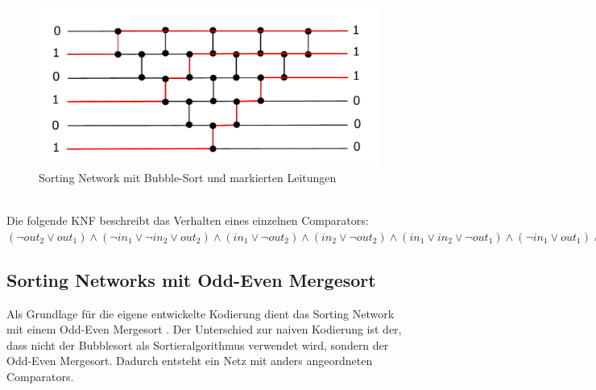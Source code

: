 \documentclass[a4,abstract=on]{scrartcl}
\begin{document}
\begin{figure}[H]
\centering
\includegraphics[width=\textwidth]{sorting_network_bubble_rot.pdf}
\caption{Sorting Network mit Bubble-Sort und markierten Leitungen}
\label{fig:sorting_network_naiv_bsp1}
\end{figure}
\ \\
Die folgende KNF beschreibt das Verhalten eines einzelnen Comparators:\\
$(\neg out_2 \vee out_1) \wedge (\neg in_1 \vee \neg in_2 \vee out_2) \wedge (in_1 \vee \neg out_2) \wedge (in_2 \vee \neg out_2) \wedge (in_1 \vee in_2 \vee \neg out_1) \wedge (\neg in_1 \vee out_1) \wedge (\neg in_2 \vee out_1)$

	\subsection{Sorting Networks mit Odd-Even Mergesort}
Als Grundlage für die eigene entwickelte Kodierung dient das Sorting Network mit einem Odd-Even Mergesort \cite[vgl.][]{odd-even}. Der Unterschied zur naiven Kodierung ist der, dass nicht der Bubblesort als Sortieralgorithmus verwendet wird, sondern der Odd-Even Mergesort. Dadurch entsteht ein Netz mit anders angeordneten Comparators.
\end{document}
